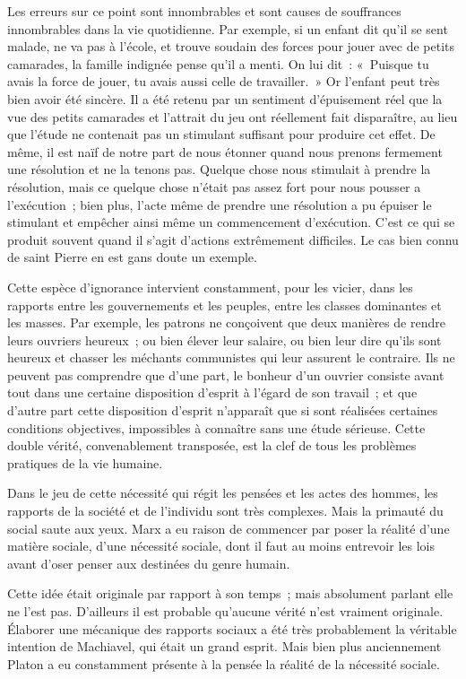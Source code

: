 \documentclass[french,twoside]{book} %
\begin{document}
Les erreurs sur ce point sont innombrables et sont causes de souffrances innombrables dans la vie quotidienne. Par exemple, si un enfant dit qu'il se sent malade, ne va pas à l'école, et trouve soudain des forces pour jouer avec de petits camarades, la famille indignée pense qu'il a menti. On lui dit : « Puisque tu avais la force de jouer, tu avais aussi celle de travailler. » Or l'enfant peut très bien avoir été sincère. Il a été retenu par un sentiment d'épuisement réel que la vue des petits camarades et l'attrait du jeu ont réellement fait disparaître, au lieu que l'étude ne contenait pas un stimulant suffisant pour produire cet effet. De même, il est naïf de notre part de nous étonner quand nous prenons fermement une résolution et ne la tenons pas. Quelque chose nous stimulait à prendre la résolution, mais ce quelque chose n'était pas assez fort pour nous pousser a l'exécution ; bien plus, l'acte même de prendre une résolution a pu épuiser le stimulant et empêcher ainsi même un commencement d'exécution. C'est ce qui se produit souvent quand il s'agit d'actions extrêmement difficiles. Le cas bien connu de saint Pierre en est gans doute un exemple.\par
Cette espèce d'ignorance intervient constamment, pour les vicier, dans les rapports entre les gouvernements et les peuples, entre les classes dominantes et les masses. Par exemple, les patrons ne conçoivent que deux manières de rendre leurs ouvriers heureux ; ou bien élever leur salaire, ou bien leur dire qu'ils sont heureux et chasser les méchants communistes qui leur assurent le contraire. Ils ne peuvent pas comprendre que d'une part, le bonheur d'un ouvrier consiste avant tout dans une certaine disposition d'esprit à l'égard de son travail ; et que d'autre part cette disposition d'esprit n'apparaît que si sont réalisées certaines conditions objectives, impossibles à connaître sans une étude sérieuse. Cette double vérité, convenablement transposée, est la clef de tous les problèmes pratiques de la vie humaine.\par
Dans le jeu de cette nécessité qui régit les pensées et les actes des hommes, les rapports de la société et de l'individu sont très complexes. Mais la primauté du social saute aux yeux. Marx a eu raison de commencer par poser la réalité d'une matière sociale, d'une nécessité sociale, dont il faut au moins entrevoir les lois avant d'oser penser aux destinées du genre humain.\par
Cette idée était originale par rapport à son temps ; mais absolument parlant elle ne l'est pas. D'ailleurs il est probable qu'aucune vérité n'est vraiment originale. Élaborer une mécanique des rapports sociaux a été très probablement la véritable intention de Machiavel, qui était un grand esprit. Mais bien plus anciennement Platon a eu constamment présente à la pensée la réalité de la nécessité sociale.\par
\end{document}
